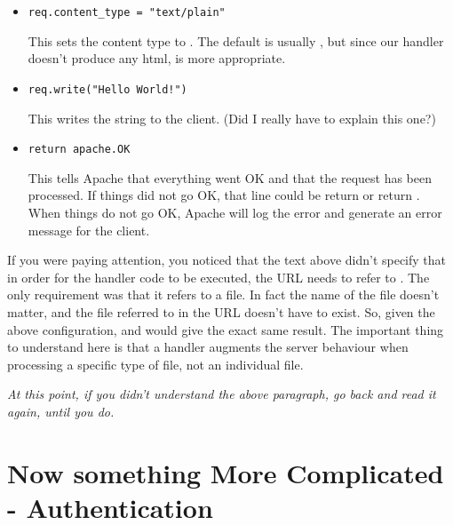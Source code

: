 \begin{enumerate}
\begin{itemize}
  \item
    \begin{verbatim}
req.content_type = "text/plain"
    \end{verbatim}

    This sets the content type to . The default is usually
    , but since our handler doesn't produce any html,
     is more appropriate.

  \item
    \begin{verbatim}
req.write("Hello World!")
    \end{verbatim}

    This writes the  string to the client. (Did I really
    have to explain this one?)

  \item
    \begin{verbatim}
return apache.OK
    \end{verbatim}

    This tells Apache that everything went OK and that the request has
    been processed. If things did not go OK, that line could be return
     or return
    . When things do not go OK, Apache
    will log the error and generate an error message for the client.
  \end{itemize}
\end{enumerate}

 If you were paying attention, you
noticed that the text above didn't specify that in order for the
handler code to be executed, the URL needs to refer to
. The only requirement was that it refers to a
 file. In fact the name of the file doesn't matter, and
the file referred to in the URL doesn't have to exist. So, given the
above configuration,  and
 would give the exact
same result. The important thing to understand here is that a handler
augments the server behaviour when processing a specific type of file,
not an individual file.

\emph{At this point, if you didn't understand the above paragraph, go
  back and read it again, until you do.}

\section{Now something More Complicated - Authentication\label{tut-more-complicated}}

